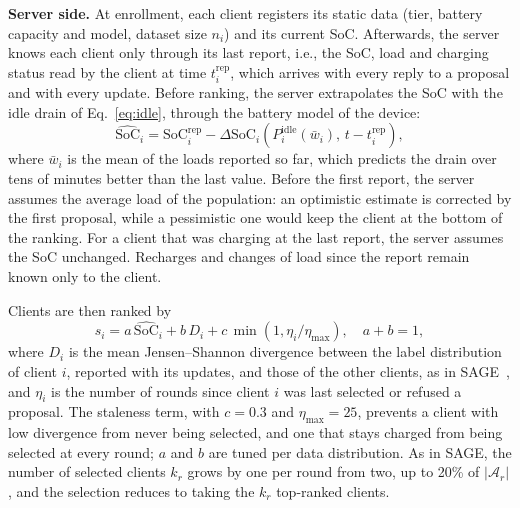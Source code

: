 \textbf{Server side.}
At enrollment, each client registers its static data (tier, battery capacity
and model, dataset size $n_i$) and its current SoC. Afterwards, the server
knows each client only through its last report, i.e., the SoC, load and
charging status read by the client at time $t_i^{\mathrm{rep}}$, which arrives
with every reply to a proposal and with every update. Before ranking, the
server extrapolates the SoC with the idle drain of Eq.~\eqref{eq:idle},
through the battery model of the device:
\begin{equation}
  \widehat{\mathrm{SoC}}_i = \mathrm{SoC}_i^{\mathrm{rep}}
  - \Delta\mathrm{SoC}_i\!\left(P^{\mathrm{idle}}_i(\bar{w}_i),\,
    t - t_i^{\mathrm{rep}}\right),
  \label{eq:estimate}
\end{equation}
where $\bar{w}_i$ is the mean of the loads reported so far, which predicts the
drain over tens of minutes better than the last value. Before the first report,
the server assumes the average load of the population: an optimistic estimate
is corrected by the first proposal, while a pessimistic one would keep the
client at the bottom of the ranking. For a client that was charging at the
last report, the server assumes the SoC unchanged. Recharges and changes of
load since the report remain known only to the client.

Clients are then ranked by
\begin{equation}
  s_i = a\,\widehat{\mathrm{SoC}}_i + b\,D_i
      + c\,\min\!\left(1, \eta_i/\eta_{\max}\right), \quad a+b=1,
  \label{eq:score}
\end{equation}
where $D_i$ is the mean Jensen--Shannon divergence between the label
distribution of client $i$, reported with its updates, and those of the other
clients, as in SAGE~\cite{savoia2026sage}, and $\eta_i$ is the number of rounds
since client $i$ was last selected or refused a proposal. The staleness term,
with $c=0.3$ and $\eta_{\max}=25$, prevents a client with low divergence from
never being selected, and one that stays charged from being selected at every
round; $a$ and $b$ are tuned per data distribution. As in SAGE, the number of
selected clients $k_r$ grows by one per round from two, up to 20\% of
$|\mathcal{A}_r|$, and the selection reduces to taking the $k_r$ top-ranked
clients.

